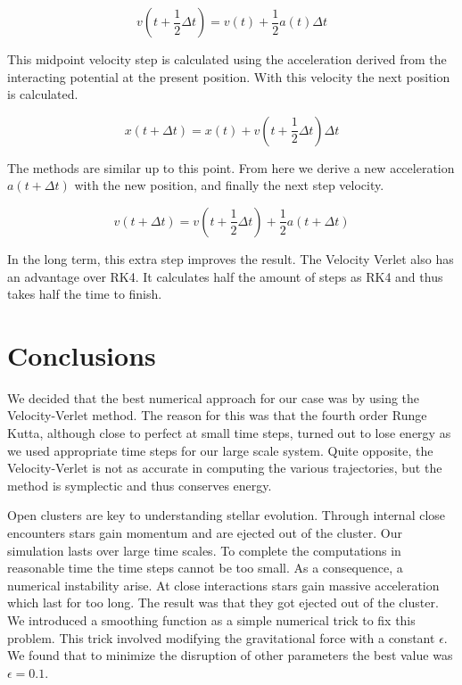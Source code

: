 \documentclass{aa}   %
\begin{document}
\begin{equation}
v(t+\frac{1}{2}\Delta t) = v(t) + \frac{1}{2}a(t)\Delta t
\end{equation}

This midpoint velocity step is calculated using the acceleration derived from the interacting potential at the present position. With this velocity the next position is calculated.

\begin{equation}
x(t+\Delta t) = x(t) + v(t+\frac{1}{2}\Delta t)\Delta t
\end{equation}

The methods are similar up to this point. From here we derive a new acceleration $a(t+\Delta t)$ with the new position, and finally the next step velocity.

\begin{equation}
v(t+\Delta t) = v(t+\frac{1}{2}\Delta t) + \frac{1}{2}a(t+\Delta t)
\end{equation}

In the long term, this extra step improves the result. The Velocity Verlet also has an advantage over RK4. It calculates half the amount of steps as RK4 and thus takes half the time to finish. 
\section{Conclusions} \label{sec:conclusions}
We decided that the best numerical approach for our case was by using the Velocity-Verlet method. The reason for this was that the fourth order Runge Kutta, although close to perfect at small time steps, turned out to lose energy as we used appropriate time steps for our large scale system. Quite opposite, the Velocity-Verlet is not as accurate in computing the various trajectories, but the method is symplectic and thus conserves energy. 

Open clusters are key to understanding stellar evolution. Through internal close encounters stars gain momentum and are ejected out of the cluster. Our simulation lasts over large time scales. To complete the computations in reasonable time the time steps cannot be too small. As a consequence, a numerical instability arise. At close interactions stars gain massive acceleration which last for too long. The result was that they got ejected out of the cluster. We introduced a smoothing function as a simple numerical trick to fix this problem. This trick involved modifying the gravitational force with a constant $\epsilon$. We found that to minimize the disruption of other parameters the best value was $\epsilon = 0.1$. 
\end{document}
